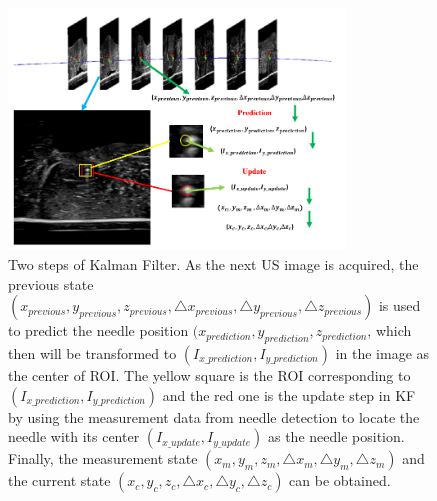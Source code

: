 \documentclass[journal,article,submit,moreauthors,pdftex]{Definitions/mdpi}
\begin{document}
\begin{figure}[H]
\centering
\includegraphics[width=0.8\textwidth]{figures/2/f4_g1.pdf}
\captionsetup{width=16 cm,justification=centering}
\caption{
Two steps of Kalman Filter.
As the next US image is acquired, the previous state ${(x_{previous},y_{previous},z_{previous},\triangle x_{previous},\triangle y_{previous},\triangle z_{previous})}$ is used to predict the needle position ${(x_{prediction},y_{prediction},z_{prediction}}$, which then will be transformed to ${(I_{x\_prediction},I_{y\_prediction})}$ in the image as the center of ROI.
The yellow square is the ROI corresponding to ${(I_{x\_prediction},I_{y\_prediction})}$ and the red one is the update step in KF by using the measurement data from needle detection to locate the needle with its center ${(I_{x\_update},I_{y\_update})}$ as the needle position.
Finally, the measurement state ${(x_{m},y_{m},z_{m}, \triangle x_{m},\triangle y_{m},\triangle z_{m})}$ and the current state ${(x_{c},y_{c},z_{c}, \triangle x_{c},\triangle y_{c},\triangle z_{c})}$ can be obtained.
}\label{fig:4}
\end{figure}
\end{document}
